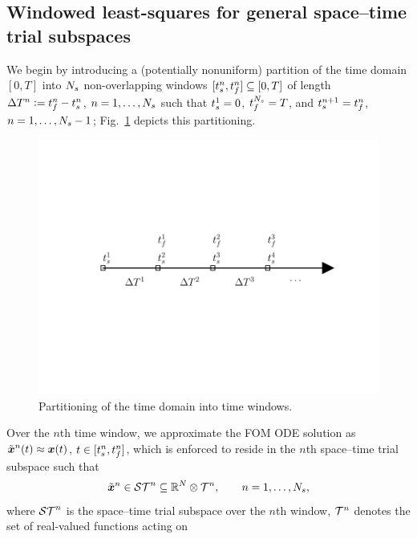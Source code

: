 \subsection{Windowed least-squares for general space--time trial subspaces} 
We begin by introducing a (potentially nonuniform) partition of the time domain $[0,T]$
into $N_s$ non-overlapping windows $[t_s^{n} ,
t_f^{n}]\subseteq[0,T]$ of length $\Delta T^{n}\vcentcolon=t_f^{n} -
t_s^{n}$, $n=1,\ldots,N_s$ such that 
$t_s^{1} = 0$, $t_f^{N_s} = T$, and
$t_s^{n+1} = t_f^{n}$,
$n=1,\ldots,N_s-1$; Fig.~\ref{fig:slab_fig} depicts this partitioning.
\begin{figure} 
\begin{centering} 
\includegraphics[trim={0.0cm 5cm 0cm 3cm},clip,width=1.0\textwidth]{figs/time_grid.pdf} 
\caption{Partitioning of the time
domain into time windows.} 
\label{fig:slab_fig} 
\end{centering} 
\end{figure}
Over the $n$th time window, we approximate the FOM ODE solution as 
$\tilde{\boldsymbol x}^n(t)\approx {\boldsymbol x}(t)$,
$t\in[t_s^{n},t_f^{n}]$, which is enforced to reside in 
the $n$th space--time trial subspace such that
\begin{equation}
\tilde{\boldsymbol x}^n \in \mathcal{ ST }^n \subseteq \mathbb{R}^{N} \otimes \mathcal{T}^{n} , \qquad  n = 1,\ldots,N_s,
\end{equation}
where $\mathcal{ ST }^{n}$ is the space--time trial subspace over the $n$th window, $\mathcal{T}^{n}$ denotes the set of real-valued functions acting on
